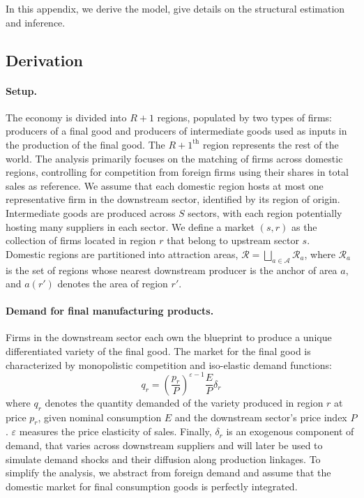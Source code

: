 

In this appendix, we derive the model, give details on the structural estimation and inference. 

\subsection{Derivation}

\label{apsec:structural}

\paragraph{Setup.}
The economy is divided into $R+1$ regions, populated by two types of firms: producers of a final good and producers of intermediate goods used as inputs in the production of the final good. The $R+1^{\text{th}}$ region represents the rest of the world. The analysis primarily focuses on the matching of firms across domestic regions, controlling for competition from foreign firms using their shares in total sales as reference. We assume that each domestic region hosts at most one representative firm in the downstream sector, identified by its region of origin. Intermediate goods are produced across $S$ sectors, with each region potentially hosting many suppliers in each sector. We define a market $(s,r)$ as the collection of firms located in region $r$ that belong to upstream sector $s$.\\

Domestic regions are partitioned into attraction areas,
$\mathcal{R}=\bigsqcup_{a\in\mathcal{A}}\mathcal{R}_{a}$, where $\mathcal{R}_{a}$ is the set of
regions whose nearest downstream producer is the anchor of area $a$, and $a(r')$ denotes the
area of region $r'$.


\paragraph{Demand for final manufacturing products.} Firms in the downstream sector each own the blueprint to produce a unique differentiated variety of the final good. The market for the final good is characterized by monopolistic competition and iso-elastic demand functions:
$$q_r=\left(\frac{p_r}{P}\right)^{\varepsilon-1}\frac{E}{P}\delta_r$$
where $q_r$ denotes the quantity demanded of the variety produced in region $r$ at price $p_r$, given nominal consumption $E$ and the downstream sector's price index $P$. $\varepsilon$ measures the price elasticity of sales. Finally, $\delta_r$ is an exogenous component of demand, that varies across downstream suppliers and will later be used to simulate demand shocks and their diffusion along production linkages. To simplify the analysis, we abstract from foreign demand and assume that the domestic market for final consumption goods is perfectly integrated. 



